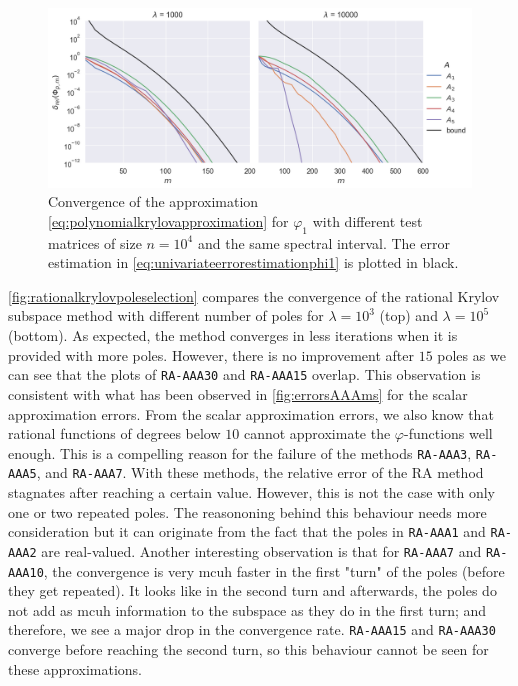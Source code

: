 \begin{figure}[h]
    \centering
    \includegraphics[width=.9\textwidth]{img/krylovapproximation/cnvg_matrices_PA_n10000.png}
    \caption{Convergence of the approximation \eqref{eq:polynomialkrylovapproximation}
    for $\varphi_1$ with different test matrices of size $n=10^4$ and the same spectral interval.
    The error estimation in \eqref{eq:univariateerrorestimationphi1} is plotted in black.}
    \label{fig:krylovapproximationmatrices}
\end{figure}

\autoref{fig:rationalkrylovpoleselection} compares the convergence of the
rational Krylov subspace method with different number of poles for $\lambda=10^3$ (top)
and $\lambda=10^5$ (bottom).
As expected, the method converges in less iterations when it is provided with more poles.
However, there is no improvement after $15$ poles as we can see that the plots of \texttt{RA-AAA30}
and \texttt{RA-AAA15} overlap. This observation is consistent with what has been observed
in \autoref{fig:errorsAAAms} for the scalar approximation errors.
From the scalar approximation errors, we also know that rational functions of degrees below
$10$ cannot approximate the $\varphi$-functions well enough. This is a compelling reason
for the failure of the methods \texttt{RA-AAA3}, \texttt{RA-AAA5}, and \texttt{RA-AAA7}.
With these methods, the relative error of the RA method stagnates after reaching a certain
value. However, this is not the case with only one or two repeated poles. The reasononing behind
this behaviour needs more consideration but it can originate from the fact that the poles
in \texttt{RA-AAA1} and \texttt{RA-AAA2} are real-valued.
Another interesting observation is that for \texttt{RA-AAA7} and \texttt{RA-AAA10}, the convergence
is very mcuh faster in the first "turn" of the poles (before they get repeated). It looks like
in the second turn and afterwards, the poles do not add as mcuh information to the subspace
as they do in the first turn; and therefore, we see a major drop in the convergence rate.
\texttt{RA-AAA15} and \texttt{RA-AAA30} converge before reaching the second turn, so this
behaviour cannot be seen for these approximations.

